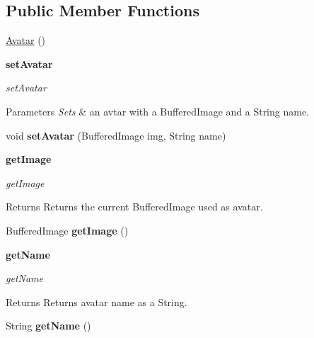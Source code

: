\subsection*{Public Member Functions}
\begin{DoxyCompactItemize}
\item 
\hyperlink{classbattleship_1_1screen_1_1Avatar_a550b297b7ad26f485f40cb46b3bba76b}{Avatar} ()
\end{DoxyCompactItemize}
\begin{Indent}{\bf set\+Avatar}\par
{\em set\+Avatar


\begin{DoxyParams}{Parameters}
{\em Sets} & an avtar with a Buffered\+Image and a String name. \\
\hline
\end{DoxyParams}
}\begin{DoxyCompactItemize}
\item 
\hypertarget{classbattleship_1_1screen_1_1Avatar_a2cca62a624617725d7d47e2dac2af7e2}{}void {\bfseries set\+Avatar} (Buffered\+Image img, String name)\label{classbattleship_1_1screen_1_1Avatar_a2cca62a624617725d7d47e2dac2af7e2}

\end{DoxyCompactItemize}
\end{Indent}
\begin{Indent}{\bf get\+Image}\par
{\em get\+Image

\begin{DoxyReturn}{Returns}
Returns the current Buffered\+Image used as avatar. 
\end{DoxyReturn}
}\begin{DoxyCompactItemize}
\item 
\hypertarget{classbattleship_1_1screen_1_1Avatar_af432ec8dd13557035d4373a7d66f788b}{}Buffered\+Image {\bfseries get\+Image} ()\label{classbattleship_1_1screen_1_1Avatar_af432ec8dd13557035d4373a7d66f788b}

\end{DoxyCompactItemize}
\end{Indent}
\begin{Indent}{\bf get\+Name}\par
{\em get\+Name

\begin{DoxyReturn}{Returns}
Returns avatar name as a String. 
\end{DoxyReturn}
}\begin{DoxyCompactItemize}
\item 
\hypertarget{classbattleship_1_1screen_1_1Avatar_a913259227998a1b7a62618c079b7be5b}{}String {\bfseries get\+Name} ()\label{classbattleship_1_1screen_1_1Avatar_a913259227998a1b7a62618c079b7be5b}

\end{DoxyCompactItemize}
\end{Indent}
